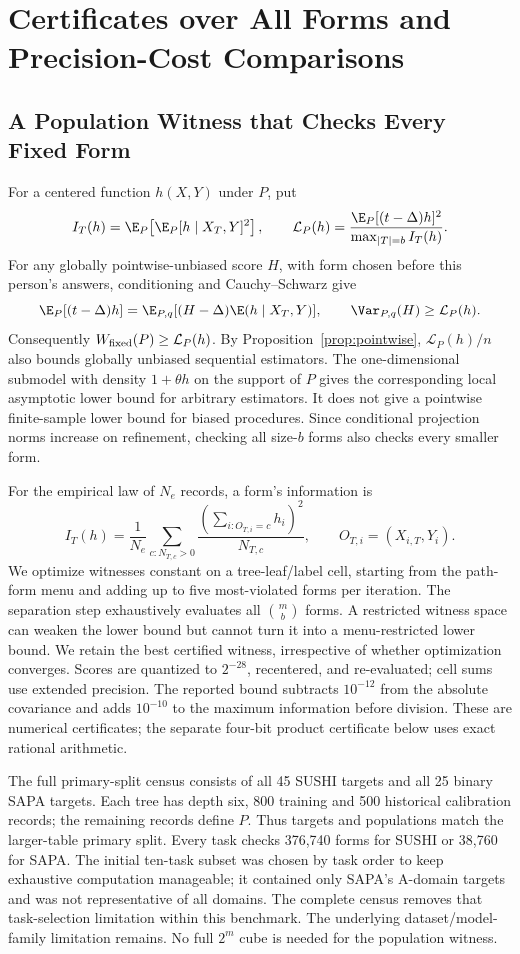 \section{Certificates over All Forms and Precision-Cost Comparisons}\label{app:allforms}
\subsection{A Population Witness that Checks Every Fixed Form}
For a centered function $h(X,Y)$ under $P$, put
\[
 I_T(h)=\E_P\!\left[\E_P[h\mid X_T,Y]^2\right],\qquad
 \mathcal L_P(h)=\frac{\E_P[(t-\Delta)h]^2}
                         {\max_{|T|=b} I_T(h)}.
\]
For any globally pointwise-unbiased score $H$, with form chosen before this
person's answers, conditioning and Cauchy--Schwarz give
\[
 \E_P[(t-\Delta)h]
 =\E_{P,q}[(H-\Delta)\E(h\mid X_T,Y)],\qquad
 \Var_{P,q}(H)\ge\mathcal L_P(h).
\]
Consequently $W_{\rm fixed}(P)\ge\mathcal L_P(h)$. By
Proposition~\ref{prop:pointwise}, $\mathcal L_P(h)/n$ also bounds globally
unbiased sequential estimators. The one-dimensional submodel with density
$1+\theta h$ on the support of $P$ gives the corresponding local asymptotic
lower bound for arbitrary estimators. It does not give a pointwise
finite-sample lower bound for biased procedures. Since conditional projection
norms increase on refinement, checking all size-$b$ forms also checks every
smaller form.

For the empirical law of $N_e$ records, a form's information is
\[
 I_T(h)=\frac1{N_e}\sum_{c:N_{T,c}>0}
                 \frac{(\sum_{i:O_{T,i}=c}h_i)^2}{N_{T,c}},
 \qquad O_{T,i}=(X_{i,T},Y_i).
\]
We optimize witnesses constant on a tree-leaf/label cell, starting from the
path-form menu and adding up to five most-violated forms per iteration.
The separation step exhaustively evaluates all $\binom mb$ forms. A restricted
witness space can weaken the lower bound but cannot turn it into a
menu-restricted lower bound. We retain the best certified witness, irrespective
of whether optimization converges. Scores are quantized to $2^{-28}$,
recentered, and re-evaluated; cell sums use extended precision. The reported
bound subtracts $10^{-12}$ from the absolute covariance and adds $10^{-10}$
to the maximum information before division. These are numerical certificates;
the separate four-bit product certificate below uses exact rational arithmetic.

The full primary-split census consists of all 45 SUSHI targets and all
25 binary SAPA targets. Each tree has depth six, 800 training and 500
historical calibration records; the remaining records define $P$. Thus
targets and populations match the larger-table primary split. Every task
checks 376,740 forms for SUSHI or 38,760 for SAPA. The initial ten-task
subset was chosen by task order to keep exhaustive computation manageable;
it contained only SAPA's A-domain targets and was not representative of
all domains. The complete census removes that task-selection limitation
within this benchmark. The underlying dataset/model-family limitation
remains. No full $2^m$ cube is needed for the population witness.

